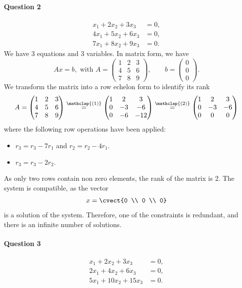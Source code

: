 \paragraph*{Question 2}
\begin{align*}
x_1+2x_2+3x_3 & = 0,\\
4x_1+5x_2+6x_3 & = 0,\\
7x_1+8x_2+9x_3 & =0.
\end{align*}
We have 3 equations and 3 variables. In matrix form, we have
\[
Ax = b, \text{ with } A= \begin{pmatrix}
1&2&3\\ 4&5&6\\ 7&8&9
\end{pmatrix}, \qquad b = \begin{pmatrix}
0\\0\\0
\end{pmatrix}.
\]
We transform the matrix into a row echelon form to identify its rank
\[
A=
\begin{pmatrix}
  1 & 2 & 3 \\ 4 & 5 & 6 \\ 7 & 8 & 9 
\end{pmatrix}
\stackrel{\mathclap{(1)}}{=}
\begin{pmatrix}
  1 & 2 & 3 \\ 0 & -3 & -6 \\ 0 & -6 & -12 
\end{pmatrix}
\stackrel{\mathclap{(2)}}{=}
\begin{pmatrix}
  1 & 2 & 3 \\ 0 & -3 & -6 \\ 0 & 0 & 0 
\end{pmatrix}
\]
where the following row operations have been applied:
\begin{itemize}
\item[(1)] $r_3 = r_3 - 7r_1$ and $r_2=r_2-4r_1$.
\item[(2)] $r_3 = r_3-2 r_2$.
\end{itemize}
As only two rows contain non zero elements, the rank of the matrix is 2. 
The system is compatible, as the vector
\[
x=\cvect{0 \\ 0 \\ 0}
\]
is a solution of the system. Therefore, one of the constraints is
redundant, and there is an infinite number of solutions.

\paragraph*{Question 3}
\begin{align*}
x_1+2x_2+3x_3 & = 0,\\
2x_1+4x_2+6x_3 & =0,\\
5x_1+10x_2+15x_3 & =0.
\end{align*}


